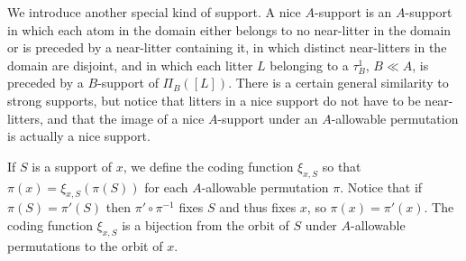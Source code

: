\documentclass{slides}
\begin{document}
\begin{slide}

We introduce another special kind of support.  A nice $A$-support is an $A$-support in which each atom in the domain either belongs to no near-litter in the domain
or is preceded by a near-litter containing it, in which distinct near-litters in the domain are disjoint, and in which each litter $L$ belonging to a $\tau^1_B$, $B \ll A$, is preceded by a $B$-support of $\Pi_B([L])$.  There is a certain general similarity to strong supports, but notice that litters in a nice support do not have to be near-litters, and that the image of a nice $A$-support under an $A$-allowable permutation is actually a nice support.

\end{slide}

\begin{slide}


If $S$ is a support of $x$, we define the coding function $\xi_{x,S}$ so that $\pi(x) = \xi_{x,S}(\pi(S))$ for each $A$-allowable permutation $\pi$.  Notice that if $\pi(S)=\pi'(S)$ then $\pi'\circ \pi^{-1}$ fixes $S$ and thus fixes $x$, so $\pi(x) = \pi'(x)$.  The coding function $\xi_{x,S}$  is a bijection from the orbit of $S$ under $A$-allowable permutations to the orbit of $x$.


\end{slide}
\end{document}
